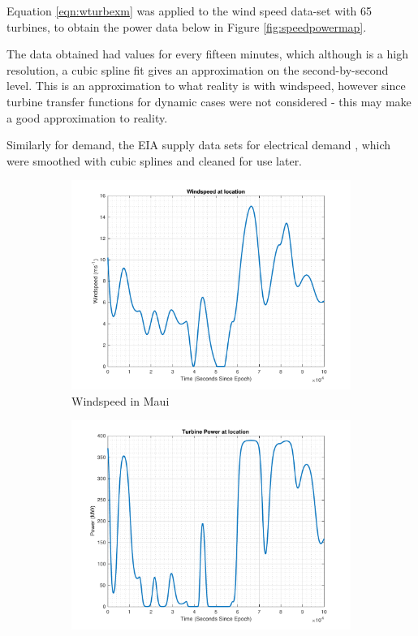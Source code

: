 Equation \ref{eqn:wturbexm} was applied to the wind speed data-set with 65 turbines, to obtain the power data below in Figure \ref{fig:speedpowermap}.

The data obtained had values for every fifteen minutes, which although is a high resolution, a cubic spline fit gives an approximation on the second-by-second level.
This is an approximation to what reality is with windspeed, however since turbine transfer functions for dynamic cases were not considered - this may make a good approximation to reality.

Similarly for demand, the EIA supply data sets for electrical demand \cite{power:EIA}, which were smoothed with cubic splines and cleaned for use later.

\begin{figure}[t]
\centering
\begin{subfigure}{.5\textwidth}
  \centering
  \includegraphics[scale=0.4]{./images/AWindspeed-eps-converted-to.pdf}
  \caption{Windspeed in Maui}
  \label{fig:windspeed}
\end{subfigure}%
\begin{subfigure}{.5\textwidth}
  \centering
  \includegraphics[scale=0.4]{./images/AWindpower-eps-converted-to.pdf}

\end{subfigure}
\end{figure}
